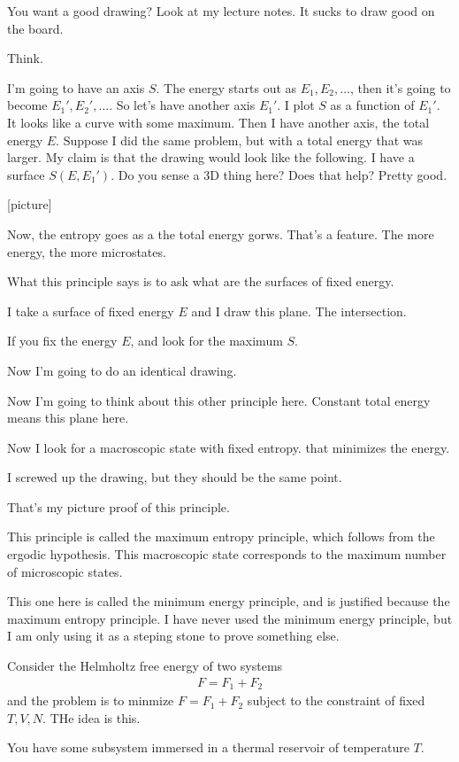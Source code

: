 You want a good drawing?
Look at my lecture notes.
It sucks to draw good on the board.

Think.

I'm going to have an axis $S$.
The energy starts out as $E_1,E_2,\ldots$,
then it's going to become
$E_1',E_2',\ldots$.
So let's have another axis $E_1'$.
I plot $S$ as a function of $E_1'$.
It looks like a curve with some maximum.
Then I have another axis,
the total energy $E$.
Suppose I did the same problem,
but with a total energy that was larger.
My claim is that the drawing would look like the following.
I have a surface $S(E,E_1')$.
Do you sense a 3D thing here?
Does that help?
Pretty good.

[picture]

Now,
the entropy goes as a the total energy gorws.
That's a feature.
The more energy,
the more microstates.

What this principle says is to ask what are the surfaces of fixed energy.

I take a surface of fixed energy $E$
and I draw this plane.
The intersection.

If you fix the energy $E$,
and look for the maximum $S$.

Now I'm going to do an identical drawing.

Now I'm going to think about this other principle here.
Constant total energy means this plane here.

Now I look for a macroscopic state with fixed entropy.
that minimizes the energy.

I screwed up the drawing,
but they should be the same point.

That's my picture proof of this principle.

This principle is called the maximum entropy principle,
which follows from the ergodic hypothesis.
This macroscopic state corresponds to the maximum number of microscopic states.

This one here is called the minimum energy principle,
and is justified because the maximum entropy principle.
I have never used the minimum energy principle,
but I am only using it as a steping stone to prove something else.


Consider the Helmholtz free energy of two systems
\begin{align}
    F = F_1 + F_2
\end{align}
and the problem is to minmize $F=F_1+F_2$ subject
to the constraint of fixed $T,V,N$.
THe idea is this.

You have some subsystem immersed in a thermal reservoir of temperature
$T$.


